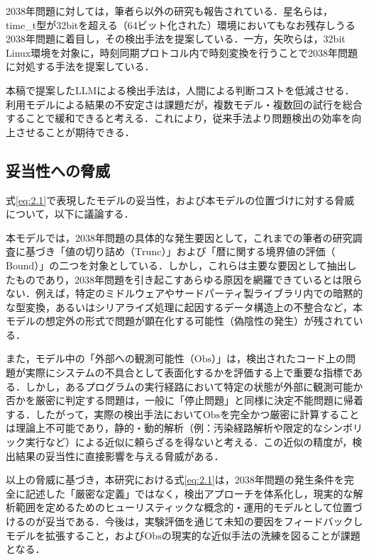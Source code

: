 \documentclass[submit,techrep,noauthor]{ipsj-lualatex}
\begin{document}
2038年問題に対しては，筆者ら以外の研究も報告されている．星名らは，time\_t型が32bitを超える（64ビット化された）環境においてもなお残存しうる2038年問題に着目し，その検出手法を提案している\cite{ref13}．一方，矢吹らは，32bit Linux環境を対象に，時刻同期プロトコル内で時刻変換を行うことで2038年問題に対処する手法を提案している\cite{ref14}．

本稿で提案したLLMによる検出手法は，人間による判断コストを低減させる．利用モデルによる結果の不安定さは課題だが，複数モデル・複数回の試行を総合することで緩和できると考える．これにより，従来手法より問題検出の効率を向上させることが期待できる．

\subsection{妥当性への脅威}
\label{sec:妥当性への脅威}

式\ref{eq:2.1}で表現したモデルの妥当性，および本モデルの位置づけに対する脅威について，以下に議論する．

本モデルでは，2038年問題の具体的な発生要因として，これまでの筆者の研究調査に基づき「値の切り詰め（$\mathrm{Trunc}$）」および「暦に関する境界値の評価（$\mathrm{Bound}$）」の二つを対象としている．しかし，これらは主要な要因として抽出したものであり，2038年問題を引き起こすあらゆる原因を網羅できているとは限らない．例えば，特定のミドルウェアやサードパーティ製ライブラリ内での暗黙的な型変換，あるいはシリアライズ処理に起因するデータ構造上の不整合など，本モデルの想定外の形式で問題が顕在化する可能性（偽陰性の発生）が残されている．

また，モデル中の「外部への観測可能性（$\mathrm{Obs}$）」は，検出されたコード上の問題が実際にシステムの不具合として表面化するかを評価する上で重要な指標である．しかし，あるプログラムの実行経路において特定の状態が外部に観測可能か否かを厳密に判定する問題は，一般に「停止問題」\cite{ref15}と同様に決定不能問題に帰着する．したがって，実際の検出手法において$\mathrm{Obs}$を完全かつ厳密に計算することは理論上不可能であり，静的・動的解析（例：汚染経路解析や限定的なシンボリック実行など）\cite{ref16}による近似に頼らざるを得ないと考える．この近似の精度が，検出結果の妥当性に直接影響を与える脅威がある．

以上の脅威に基づき，本研究における式\ref{eq:2.1}は，2038年問題の発生条件を完全に記述した「厳密な定義」ではなく，検出アプローチを体系化し，現実的な解析範囲を定めるためのヒューリスティックな概念的・運用的モデルとして位置づけるのが妥当である．今後は，実験評価を通じて未知の要因をフィードバックしモデルを拡張すること，および$\mathrm{Obs}$の現実的な近似手法の洗練を図ることが課題となる．
\end{document}
